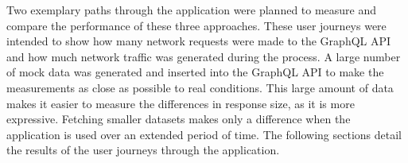 \noindent Two exemplary paths through the application were planned to measure and compare the performance of these three approaches. These user journeys were intended to show how many network requests were made to the GraphQL \ac{API} and how much network traffic was generated during the process. A large number of mock data was generated and inserted into the GraphQL \ac{API} to make the measurements as close as possible to real conditions. This large amount of data makes it easier to measure the differences in response size, as it is more expressive. Fetching smaller datasets makes only a difference when the application is used over an extended period of time. The following sections detail the results of the user journeys through the application.






